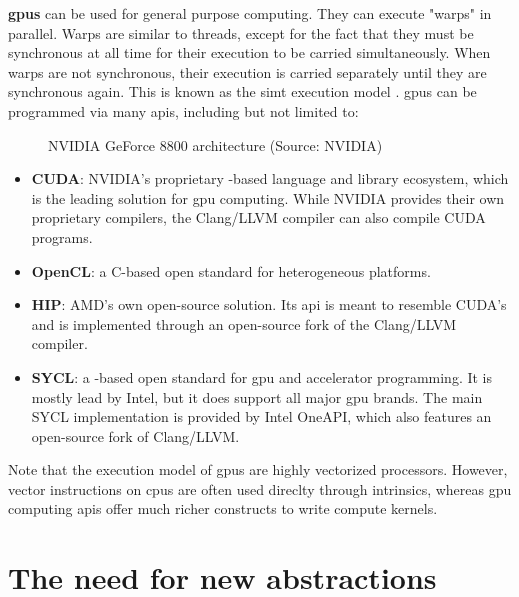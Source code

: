 \documentclass[main]{subfiles}
\begin{document}

\textbf{\glspl{gpu}} can be used for general purpose
computing. They can execute "warps" in parallel. Warps are similar to threads,
except for the fact that they must be synchronous at all time for their
execution to be carried simultaneously. When warps are not synchronous,
their execution is carried separately until they are synchronous again.
This is known as the \gls{simt} execution model \cite{nvidia-tesla}.
\glspl{gpu} can be programmed via many \glspl{api},
including but not limited to:

\begin{figure}[h]
\fontsize{8}{10}\selectfont

\caption{NVIDIA GeForce 8800 architecture (Source: NVIDIA)}
\label{fig:nvidia-fermi}
\end{figure}

\begin{itemize}
\item
\textbf{CUDA}: NVIDIA's proprietary \cpp-based language and library
ecosystem, which is the leading solution for \gls{gpu} computing.
While NVIDIA provides their own proprietary compilers, the Clang/LLVM
compiler can also compile CUDA programs.

\item
\textbf{OpenCL}: a C-based open standard for heterogeneous platforms.

\item
\textbf{HIP}: AMD's own open-source solution. Its \gls{api} is meant to
resemble CUDA's and is implemented through an open-source fork of the
Clang/LLVM compiler.

\item
\textbf{SYCL}: a \cpp-based open standard for \gls{gpu} and
accelerator programming. It is mostly lead by Intel, but it does support
all major \gls{gpu} brands. The main SYCL implementation is provided by
Intel OneAPI, which also features an open-source fork of Clang/LLVM.

\end{itemize}
Note that the execution model of \glspl{gpu} are highly vectorized processors.
However, vector instructions on \glspl{cpu} are often used direclty through
intrinsics, whereas \gls{gpu} computing \glspl{api} offer much richer constructs
to write compute kernels.

\section*{
  The need for new abstractions
}
\end{document}
